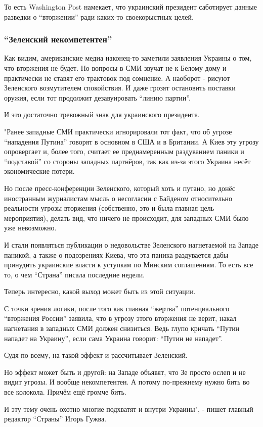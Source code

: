 То есть Washington Post намекает, что украинский президент саботирует данные
разведки о \enquote{вторжении} ради каких-то своекорыстных целей. 

\subsubsection{\enquote{Зеленский некомпетентен}}

Как видим, американские медиа наконец-то заметили заявления Украины о том, что
вторжения не будет. Но вопросы в СМИ звучат не к Белому дому и практически не
ставят его трактовок под сомнение. А наоборот - рисуют Зеленского возмутителем
спокойствия. И даже грозят остановить поставки оружия, если тот продолжит
дезавуировать \enquote{линию партии}. 

\raggedcolumns
\begin{multicols}{2} %
\setlength{\parindent}{0pt}



И это достаточно тревожный знак для украинского президента. 

"Ранее западные СМИ практически игнорировали тот факт, что об угрозе
\enquote{нападения Путина} говорят в основном в США и в Британии. А Киев эту
угрозу опровергает и, более того, считает ее преднамеренным раздуванием паники
и \enquote{подставой} со стороны западных партнёров, так как из-за этого
Украина несёт экономические потери.

Но после пресс-конференции Зеленского, который хоть и путано, но донёс
иностранным журналистам мысль о несогласии с Байденом относительно реальности
угрозы вторжения (собственно, это и была главная цель мероприятия), делать вид,
что ничего не происходит, для западных СМИ было уже невозможно.

И стали появляться публикации о недовольстве Зеленского нагнетаемой на Западе
паникой, а также о подозрениях Киева, что эта паника раздувается дабы принудить
украинские власти к уступкам по Минским соглашениям. То есть все то, о чем
\enquote{Страна} писала последние недели.

Теперь интересно, какой выход может быть из этой ситуации.

С точки зрения логики, после того как главная \enquote{жертва} потенциального
\enquote{вторжения России} заявила, что в угрозу этого вторжения не верит,
накал нагнетания в западных СМИ должен снизиться. Ведь глупо кричать
\enquote{Путин нападет на Украину}, если сама Украина говорит: \enquote{Путин
не нападет}.

\end{multicols} %

Судя по всему, на такой эффект и рассчитывает Зеленский.

Но эффект может быть и другой: на Западе объявят, что Зе просто ослеп и не
видит угрозы. И вообще некомпетентен. А потому по-прежнему нужно бить во все
колокола. Причём ещё громче бить.

И эту тему очень охотно многие подхватят и внутри Украины", - пишет главный
редактор \enquote{Страны} Игорь Гужва.
